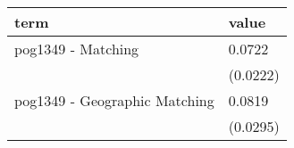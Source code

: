 
\begin{tabular}{ll}
\toprule
term & value\\
\midrule
pog1349 - Matching & 0.0722\\
 & (0.0222)\\
pog1349 - Geographic Matching & 0.0819\\
 & (0.0295)\\
\bottomrule
\end{tabular}
